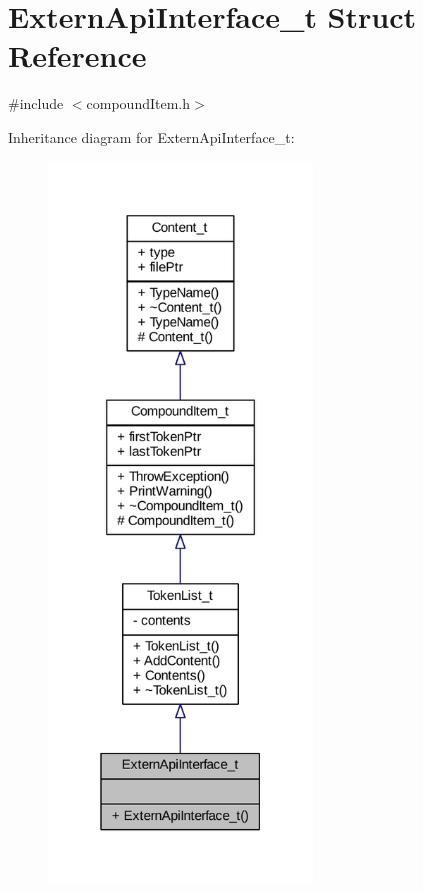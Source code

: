 \hypertarget{struct_extern_api_interface__t}{}\section{Extern\+Api\+Interface\+\_\+t Struct Reference}
\label{struct_extern_api_interface__t}


{\ttfamily \#include $<$compound\+Item.\+h$>$}



Inheritance diagram for Extern\+Api\+Interface\+\_\+t\+:
\nopagebreak
\begin{figure}[H]
\begin{center}
\leavevmode
\includegraphics[width=199pt]{struct_extern_api_interface__t__inherit__graph}
\end{center}
\end{figure}


